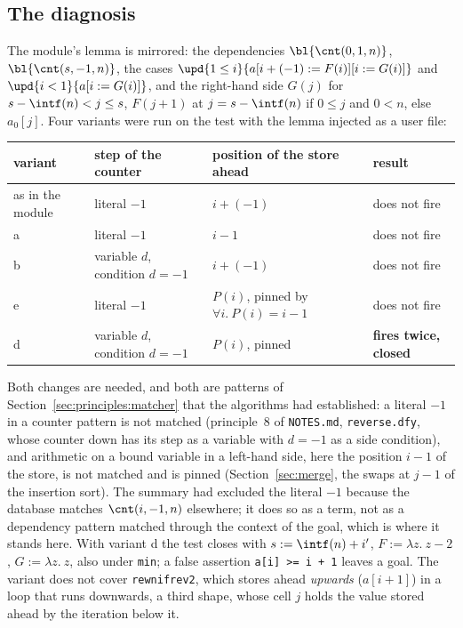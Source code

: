 \subsection{The diagnosis}
The module's lemma is  mirrored: the dependencies $\bl{\cnt(0, 1, n)}$,
$\bl{\cnt(s, -1, n)}$, the cases $\upd{1 \le i}{a[i + (-1) := F(i)][i := G(i)]}$ and $\upd{i < 1}{a[i := G(i)]}$,
and the right-hand side $G(j)$ for $s - \intf(n) < j \le s$, $F(j + 1)$ at $j = s - \intf(n)$ if $0 \le j$ and
$0 < n$, else $a_0[j]$. Four variants were run on the test with the lemma injected as a user file:
\begin{center}\footnotesize
\begin{tabular}{@{}llll@{}}
\toprule
variant & step of the counter & position of the store ahead & result \\
\midrule
as in the module & literal $-1$ & $i + (-1)$ & does not fire \\
a & literal $-1$ & $i - 1$ & does not fire \\
b & variable $d$, condition $d = -1$ & $i + (-1)$ & does not fire \\
e & literal $-1$ & $P(i)$, pinned by $\forall i.\ P(i) = i - 1$ & does not fire \\
d & variable $d$, condition $d = -1$ & $P(i)$, pinned & \textbf{fires twice, closed} \\
\bottomrule
\end{tabular}
\end{center}
Both changes are needed, and both are patterns of Section~\ref{sec:principles:matcher} that the algorithms
had established: a literal $-1$ in a counter pattern is not matched (principle~8 of \texttt{NOTES.md},
\texttt{reverse.dfy}, whose counter down has its step as a variable with $d = -1$ as a side condition), and
arithmetic on a bound variable in a left-hand side, here the position $i - 1$ of the store, is not matched
and is pinned (Section~\ref{sec:merge}, the swaps at $j - 1$ of the insertion sort). The summary had excluded
the literal $-1$ because the database matches $\cnt(i, -1, n)$ elsewhere; it does so as a term, not as a
dependency pattern matched through the context of the goal, which is where it stands here. With variant d the
test closes with $s := \intf(n) + i'$, $F := \lambda z.\ z - 2$, $G := \lambda z.\ z$, also under
\texttt{min}; a false assertion \texttt{a[i] >= i + 1} leaves a goal. The variant does not cover
\texttt{rewnifrev2}, which stores ahead \emph{upwards} ($a[i + 1]$) in a loop that runs downwards, a third
shape, whose cell $j$ holds the value stored ahead by the iteration below it.

